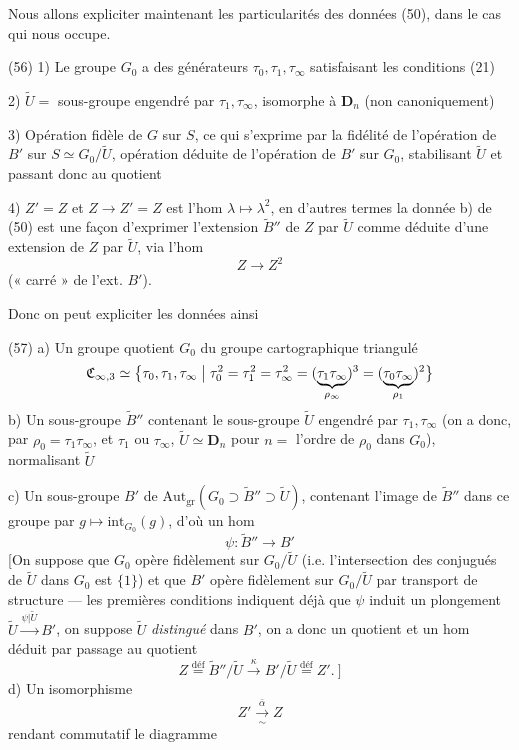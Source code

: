 \documentclass[11pt,a4paper]{article}
\begin{document}

Nous allons expliciter maintenant les particularités des données (50), dans le cas qui nous occupe.

(56) 1) Le groupe $G_0$ a des générateurs $\tau_0,\tau_1,\tau_\infty$ satisfaisant les conditions (21)

2) $\tilde{U}=$ sous-groupe engendré par $\tau_1,\tau_\infty$, isomorphe à $\mathbf{D}_n$ (non canoniquement)

3) Opération fidèle de $G$ sur $S$, ce qui s'exprime par la fidélité de l'opération de $B'$  sur $S\simeq G_0/\tilde{U}$, opération déduite de l'opération de $B'$ sur $G_0$, stabilisant $\tilde{U}$ et passant donc au quotient

4) $Z'=Z$ et $Z\to Z'=Z$ est l'hom $\lambda\mapsto\lambda^2$, en d'autres termes la donnée b) de (50) est une façon d'exprimer l'extension $\tilde{B}''$ de $Z$ par $\tilde{U}$ comme déduite d'une  extension  de $Z$ par $\tilde{U}$, via l'hom
\[
Z\longrightarrow Z^2
\]
(« carré » de l'ext. $B'$).


Donc on peut expliciter les données ainsi

(57) a) Un groupe quotient $G_0$ du groupe cartographique triangulé
\[
\mathfrak{C}_{\infty,3}\simeq\bigl\{\tau_0,\tau_1,\tau_\infty \bigm| \tau_0^2=\tau_1^2=\tau_\infty^2=(\underbrace{\tau_1\tau_\infty}_{\rho_\infty})^3=(\underbrace{\tau_0\tau_\infty}_{\rho_1})^2\bigr\}
\]
b) Un sous-groupe $\tilde{B}''$   contenant le sous-groupe $\tilde{U}$ engendré par $\tau_1,\tau_\infty$ (on a donc, par $\rho_0=\tau_1\tau_\infty$, et $\tau_1$ ou $\tau_\infty$, $\tilde{U}\simeq\mathbf{D}_n$ pour $n=$ l'ordre de $\rho_0$ dans $G_0$), normalisant $\tilde{U}$

c) Un sous-groupe $B'$ de $\mathrm{Aut}_{\mathrm{gr}}(G_0\supset\tilde{B}''\supset\tilde{U})$,  contenant l'image de $\tilde{B}''$ dans ce groupe par $g\mapsto\mathrm{int}_{G_0}(g)$, d'où un hom
\[
\psi:\tilde{B}''\longrightarrow B'
\]
[On suppose que $G_0$ opère fidèlement sur $G_0/\tilde{U}$ (i.e. l'intersection des conjugués de $\tilde{U}$ dans $G_0$ est $\{1\}$) et que $B'$ opère fidèlement sur $G_0/\tilde{U}$ par transport de structure — les premières conditions indiquent déjà que $\psi$ induit un plongement $\tilde{U}\xrightarrow{\psi|\tilde{U}}B'$, on suppose $\tilde{U}$ \emph{distingué} dans $B'$, on a donc un quotient et un hom déduit par passage au quotient
\[
Z\overset{\text{déf}}{=}\tilde{B}''/\tilde{U}\xrightarrow{\ \kappa\ }B'/\tilde{U}\overset{\text{déf}}{=}Z'.\ ]
\]
d) Un isomorphisme
\[
Z'\xrightarrow[\sim]{\ \bar{\alpha}\ }Z
\]
rendant commutatif le diagramme
\end{document}
